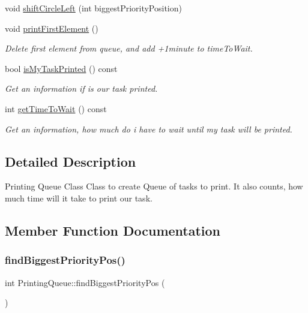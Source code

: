 \begin{DoxyCompactItemize}
void \hyperlink{class_printing_queue_a6e0a48416ddf06b841e1bae87ded0ab6}{shift\+Circle\+Left} (int biggest\+Priority\+Position)
\item 
\mbox{\label{class_printing_queue_aa2604075870694f7bd03631303e1405c}} 
void \hyperlink{class_printing_queue_aa2604075870694f7bd03631303e1405c}{print\+First\+Element} ()
\begin{DoxyCompactList}\small\item\em Delete first element from queue, and add +1minute to time\+To\+Wait. \end{DoxyCompactList}\item 
bool \hyperlink{class_printing_queue_aa0081c56e8ff9fc7acbc8eb0c552f61c}{is\+My\+Task\+Printed} () const
\begin{DoxyCompactList}\small\item\em Get an information if is our task printed. \end{DoxyCompactList}\item 
int \hyperlink{class_printing_queue_ad677a39d56b5ee403e88f4e32da606e4}{get\+Time\+To\+Wait} () const
\begin{DoxyCompactList}\small\item\em Get an information, how much do i have to wait until my task will be printed. \end{DoxyCompactList}\end{DoxyCompactItemize}


\subsection{Detailed Description}
Printing Queue Class Class to create Queue of tasks to print. It also counts, how much time will it take to print our task. 

\subsection{Member Function Documentation}
\mbox{\label{class_printing_queue_a5da114a3b589a9511b1888a42c4cab92}} 
\subsubsection{\texorpdfstring{find\+Biggest\+Priority\+Pos()}{findBiggestPriorityPos()}}
{\footnotesize\ttfamily int Printing\+Queue\+::find\+Biggest\+Priority\+Pos (\begin{DoxyParamCaption}{ }\end{DoxyParamCaption})}



